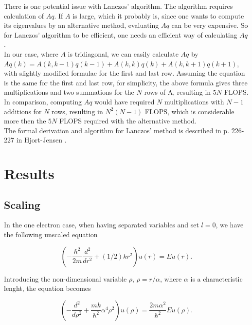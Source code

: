 \documentclass{article}
\begin{document}
There is one potential issue with Lanczos' algorithm. The algorithm requires calculation of $Aq$. If $A$ is large, which it probably is, since one wants to compute its eigenvalues by an alternative method, evaluating $Aq$ can be very expensive. So for Lanczos' algorithm to be efficient, one needs an efficient way of calculating $Aq$. \\

In our case, where $A$ is tridiagonal, we can easily calculate $Aq$ by $Aq(k) = A(k,k-1)q(k-1) + A(k,k)q(k) + A(k,k+1)q(k+1)$, with slightly modified formulae for the first and last row. Assuming the equation is the same for the first and last row, for simplicity, the above formula gives three multiplications and two summations for the $N$ rows of A, resulting in $5N$ FLOPS. In comparison, computing $Aq$ would have required $N$ multiplications with $N-1$ additions for $N$ rows, resulting in $N^2(N-1)$ FLOPS, which is considerable more then the $5N$ FLOPS required with the alternative method. \\

The formal derivation and algorithm for Lanczos' method is described in p. 226-227 in Hjort-Jensen \cite{MHJ}.

\section{Results}

\subsection{Scaling}

In the one electron case, when having separated variables and set $l = 0$, we have the following unscaled equation

\begin{equation}\label{eq:1electronUnscaled}
 \left (-\frac{\hbar^2}{2 m} \frac{d^2}{dr^2} 
 + (1/2)kr^2 
\right ) u(r)  = E u(r) .
\end{equation}

Introducing the non-dimensional variable $\rho$, $\rho = r/\alpha$, where $\alpha$ is a characteristic lenght, the equation becomes

\begin{equation}\label{eq:1electronIntermediate}
\left ( -\frac{d^2}{d\rho^2} 
+ \frac{mk}{\hbar^2} \alpha^4\rho^2\right ) u(\rho)  = \frac{2m\alpha^2}{\hbar^2}E u(\rho).
\end{equation}
\end{document}
